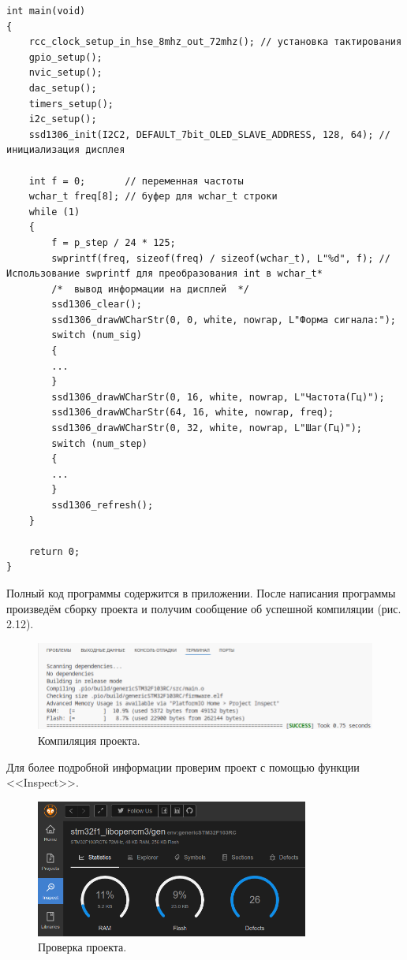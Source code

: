 \begin{code}
\begin{verbatim}
int main(void)
{
    rcc_clock_setup_in_hse_8mhz_out_72mhz(); // установка тактирования
    gpio_setup();
    nvic_setup();
    dac_setup();
    timers_setup();
    i2c_setup();
    ssd1306_init(I2C2, DEFAULT_7bit_OLED_SLAVE_ADDRESS, 128, 64); // инициализация дисплея

    int f = 0;       // переменная частоты
    wchar_t freq[8]; // буфер для wchar_t строки
    while (1)
    {
        f = p_step / 24 * 125;
        swprintf(freq, sizeof(freq) / sizeof(wchar_t), L"%d", f); // Использование swprintf для преобразования int в wchar_t*
        /*  вывод информации на дисплей  */
        ssd1306_clear();
        ssd1306_drawWCharStr(0, 0, white, nowrap, L"Форма сигнала:");
        switch (num_sig)
        {
        ...
        }
        ssd1306_drawWCharStr(0, 16, white, nowrap, L"Частота(Гц)");
        ssd1306_drawWCharStr(64, 16, white, nowrap, freq);
        ssd1306_drawWCharStr(0, 32, white, nowrap, L"Шаг(Гц)");
        switch (num_step)
        {
        ...
        }
        ssd1306_refresh();
    }

    return 0;
}
\end{verbatim}
\end{code}
	
	Полный код программы содержится в приложении. После написания программы произведём сборку проекта и получим сообщение об успешной компиляции (рис. 2.12).
	
	\begin{figure}[H]
    \centering
    \includegraphics[width=1\textwidth]{../image/compile.png}
    \caption{Компиляция проекта.}
	\end{figure}
	
	Для более подробной информации проверим проект с помощью функции <<Inspect>>.
	
	\begin{figure}[H]
    \centering
    \includegraphics[width=0.8\textwidth]{../image/inspect.png}
    \caption{Проверка проекта.}
	\end{figure}
	
